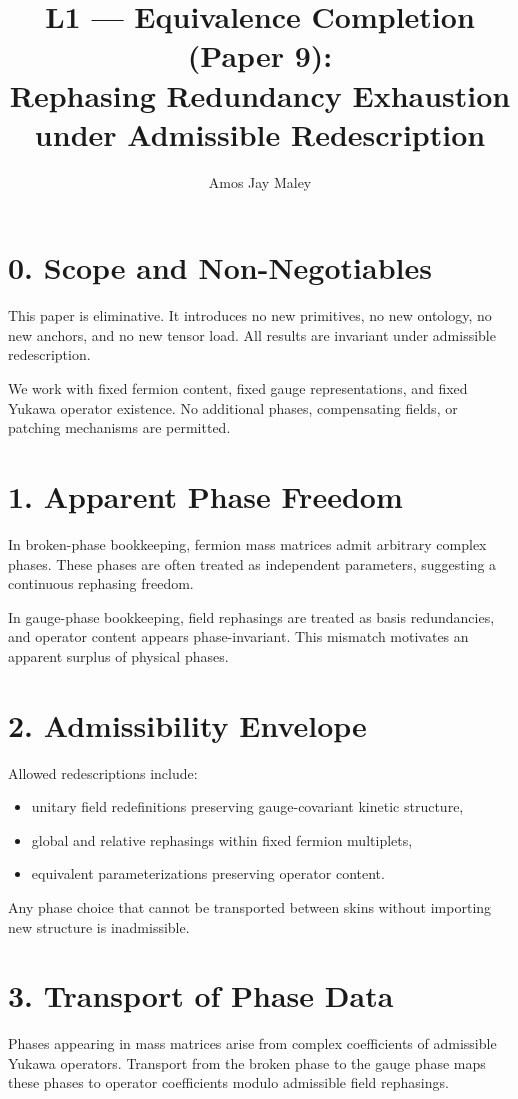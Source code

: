 ﻿\documentclass[11pt]{article}
\title{L1 --- Equivalence Completion (Paper 9):\\
Rephasing Redundancy Exhaustion under Admissible Redescription}
\author{Amos Jay Maley}
\date{}
\begin{document}
\maketitle

\section*{0. Scope and Non-Negotiables}
This paper is eliminative. It introduces no new primitives, no new ontology,
no new anchors, and no new tensor load.
All results are invariant under admissible redescription.

We work with fixed fermion content, fixed gauge representations,
and fixed Yukawa operator existence.
No additional phases, compensating fields, or patching mechanisms are permitted.

\section*{1. Apparent Phase Freedom}
In broken-phase bookkeeping,
fermion mass matrices admit arbitrary complex phases.
These phases are often treated as independent parameters,
suggesting a continuous rephasing freedom.

In gauge-phase bookkeeping,
field rephasings are treated as basis redundancies,
and operator content appears phase-invariant.
This mismatch motivates an apparent surplus of physical phases.

\section*{2. Admissibility Envelope}
Allowed redescriptions include:
\begin{itemize}
\item unitary field redefinitions preserving gauge-covariant kinetic structure,
\item global and relative rephasings within fixed fermion multiplets,
\item equivalent parameterizations preserving operator content.
\end{itemize}

Any phase choice that cannot be transported between skins
without importing new structure is inadmissible.

\section*{3. Transport of Phase Data}
Phases appearing in mass matrices arise from
complex coefficients of admissible Yukawa operators.
Transport from the broken phase to the gauge phase
maps these phases to operator coefficients
modulo admissible field rephasings.
\end{document}
